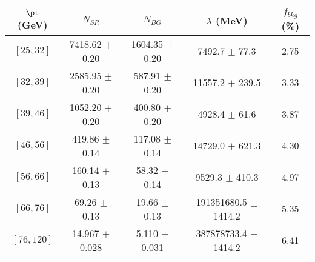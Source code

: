 \begin{tabular}{c||c|c|c||c}
$\pt$ (GeV) & $N_{SR}$ & $N_{BG}$ & $\lambda$ (MeV) & $f_{bkg}$ (\%) \\
\hline
$[25, 32]$ & 7418.62 $\pm$ 0.20 & 1604.35 $\pm$ 0.20 & 7492.7 $\pm$ 77.3 & 2.75\\
$[32, 39]$ & 2585.95 $\pm$ 0.20 & 587.91 $\pm$ 0.20 & 11557.2 $\pm$ 239.5 & 3.33\\
$[39, 46]$ & 1052.20 $\pm$ 0.20 & 400.80 $\pm$ 0.20 & 4928.4 $\pm$ 61.6 & 3.87\\
$[46, 56]$ & 419.86 $\pm$ 0.14 & 117.08 $\pm$ 0.14 & 14729.0 $\pm$ 621.3 & 4.30\\
$[56, 66]$ & 160.14 $\pm$ 0.13 & 58.32 $\pm$ 0.14 & 9529.3 $\pm$ 410.3 & 4.97\\
$[66, 76]$ & 69.26 $\pm$ 0.13 & 19.66 $\pm$ 0.13 & 191351680.5 $\pm$ 1414.2 & 5.35\\
$[76, 120]$ & 14.967 $\pm$ 0.028 & 5.110 $\pm$ 0.031 & 387878733.4 $\pm$ 1414.2 & 6.41\\
\end{tabular}
